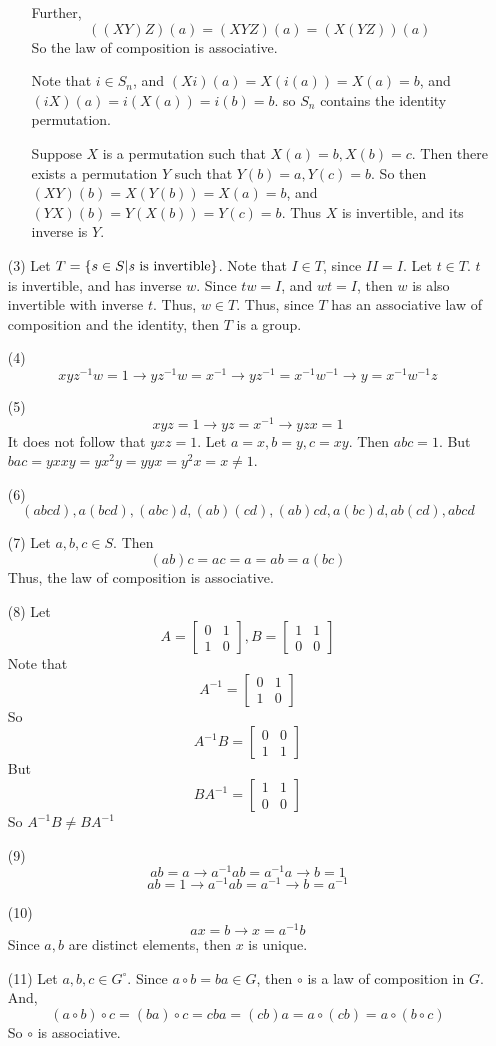 \begin{itemize}
\begin{itemize}
Further,
$$((XY)Z)(a) = (XYZ)(a) = (X(YZ))(a)$$
So the law of composition is associative.

Note that $i \in S_n$, and $(Xi)(a) = X(i(a)) = X(a) = b$, and $(iX)(a) = i(X(a)) = i(b) = b$. so $S_n$ contains the identity permutation.

Suppose $X$ is a permutation such that $X(a) = b, X(b) = c$. Then there exists a permutation $Y$ such that $Y(b) = a, Y(c) = b$. So then $(XY)(b) = X(Y(b)) = X(a) = b$, and $(YX)(b) = Y(X(b)) = Y(c) = b$. Thus $X$ is invertible, and its inverse is $Y$.
\end{itemize}
\item[(3)]
Let $T = \left\lbrace s \in S | \text{\emph{s} is invertible} \right\rbrace$. Note that $I \in T$, since $II = I$. Let $t \in T$. $t$ is invertible, and has inverse $w$. Since $tw = I$, and $wt = I$, then $w$ is also invertible with inverse $t$. Thus, $w \in T$. Thus, since $T$ has an associative law of composition and the identity, then $T$ is a group.
\item[(4)]
$$xyz^{-1}w = 1 \rightarrow yz^{-1}w = x^{-1} \rightarrow yz^{-1} = x^{-1}w^{-1} \rightarrow y = x^{-1}w^{-1}z$$
\item[(5)]
$$xyz = 1 \rightarrow yz = x^{-1} \rightarrow yzx = 1$$
It does not follow that $yxz = 1$. Let $a = x, b = y, c = xy$. Then $abc = 1$. But $bac = yxxy = yx^2y = yyx = y^2x = x \neq 1$.
\item[(6)]
$$(abcd), a(bcd), (abc)d, (ab)(cd), (ab)cd, a(bc)d, ab(cd), abcd$$
\item[(7)]
Let $a, b, c \in S$. Then
$$(ab)c = ac = a = ab = a(bc)$$
Thus, the law of composition is associative.
\item[(8)]
Let $$A = \begin{bmatrix}
0 & 1 \\
1 & 0
\end{bmatrix}, B = \begin{bmatrix}
1 & 1 \\
0 & 0
\end{bmatrix}$$
Note that
$$A^{-1} = \begin{bmatrix}
0 & 1 \\
1 & 0
\end{bmatrix}$$
So
$$A^{-1}B = \begin{bmatrix}
0 & 0 \\
1 & 1
\end{bmatrix}$$
But
$$BA^{-1} = \begin{bmatrix}
1 & 1 \\
0 & 0
\end{bmatrix}$$
So $A^{-1}B \neq BA^{-1}$
\item[(9)]
$$ab = a \rightarrow a^{-1}ab = a^{-1}a \rightarrow b = 1$$
$$ab = 1 \rightarrow a^{-1}ab = a^{-1} \rightarrow b = a^{-1}$$
\item[(10)]
$$ax = b \rightarrow x = a^{-1}b$$
Since $a, b$ are distinct elements, then $x$ is unique.
\item[(11)]
Let $a, b, c \in G^\circ$. Since $a \circ b = ba \in G$, then $\circ$ is a law of composition in $G$. And,
$$(a \circ b) \circ c = (ba) \circ c = cba = (cb)a = a \circ (cb) = a \circ (b \circ c)$$
So $\circ$ is associative.


\end{itemize}
